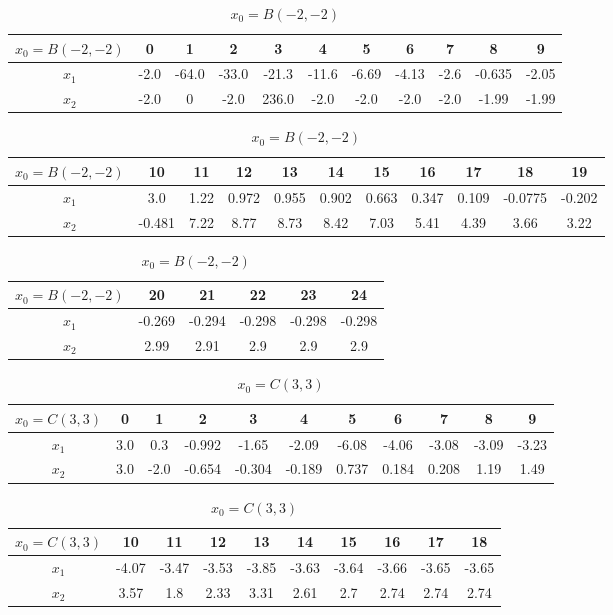\begin{table}[H]
\centering
\setlength{\abovecaptionskip}{0cm} 
\setlength{\belowcaptionskip}{-0.5cm} 
\scriptsize
\begin{tabular}{|c|c|c|c|c|c|c|c|c|c|c|}
\hline
$x_0=B(-2,-2)$&0&1&2&3&4&5&6&7&8&9\\
\hline
$x_1$&-2.0 & -64.0 & -33.0 & -21.3 & -11.6 & -6.69 & -4.13 & -2.6 & -0.635 & -2.05 \\
\hline
$x_2$&-2.0 & 0 & -2.0 & 236.0 & -2.0 & -2.0 & -2.0 & -2.0 & -1.99 & -1.99    
\\
\hline
\end{tabular}

\begin{tabular}{|c|c|c|c|c|c|c|c|c|c|c|}
\hline
$x_0=B(-2,-2)$&10&11&12&13&14&15&16&17&18&19\\
\hline
$x_1$&3.0 & 1.22 & 0.972 & 0.955 & 0.902 & 0.663 & 0.347 & 0.109 & -0.0775 & -0.202   \\
\hline
$x_2$&-0.481 & 7.22 & 8.77 & 8.73 & 8.42 & 7.03 & 5.41 & 4.39 & 3.66 & 3.22
\\
\hline
\end{tabular}

\begin{tabular}{|c|c|c|c|c|C|}
\hline
$x_0=B(-2,-2)$&20&21&22&23&24\\
\hline
$x_1$&-0.269 & -0.294 & -0.298 & -0.298 & -0.298  \\
\hline
$x_2$& 2.99 & 2.91 & 2.9 & 2.9 & 2.9
\\
\hline
\end{tabular}
\caption{$x_0=B(-2,-2)$}
\end{table}
\begin{table}[H]
\centering
\setlength{\abovecaptionskip}{0cm} 
\setlength{\belowcaptionskip}{-0.5cm}
\scriptsize
\begin{tabular}{|c|c|c|c|c|c|c|c|c|c|c|}
\hline
$x_0=C(3,3)$&0&1&2&3&4&5&6&7&8&9\\
\hline
$x_1$&3.0 & 0.3 & -0.992 & -1.65 & -2.09 & -6.08 & -4.06 & -3.08 & -3.09 & -3.23 \\
\hline
$x_2$&3.0 & -2.0 & -0.654 & -0.304 & -0.189 & 0.737 & 0.184 & 0.208 & 1.19 & 1.49
\\
\hline
\end{tabular}
\begin{tabular}{|c|c|c|c|c|c|c|c|c|c|}
\hline
$x_0=C(3,3)$&10&11&12&13&14&15&16&17&18\\
\hline
$x_1$ &-4.07 & -3.47 & -3.53 & -3.85 & -3.63 & -3.64 & -3.66 & -3.65 & -3.65\\
\hline
$x_2$ & 3.57 & 1.8 & 2.33 & 3.31 & 2.61 & 2.7 & 2.74 & 2.74 & 2.74
\\
\hline

\end{tabular}
\caption{$x_0=C(3,3)$}
\end{table}
